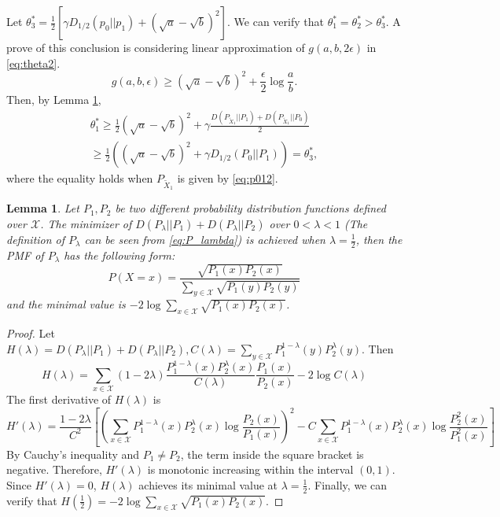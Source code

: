 \documentclass{article}
\newtheorem{lemma}{Lemma}
\begin{document}
Let $\theta^*_3 = \frac{1}{2}[\gamma D_{1/2}(p_0||p_1) + (\sqrt{a} - \sqrt{b})^2]$.
We can verify that $\theta_1^*=\theta_2^*>\theta^*_3$.
A prove of this conclusion is considering
linear approximation of $g(a,b,2\epsilon)$
in \eqref{eq:theta2}.
\begin{equation}\label{eq:g_linear}
		g(a,b,\epsilon) \geq  (\sqrt{a} - \sqrt{b})^2 + \frac{\epsilon}{2}\log \frac{a}{b}. 
	\end{equation}
	Then, by Lemma \ref{lem:p0p12},
	\begin{align*}
		\theta^*_1 \geq \frac{1}{2}(\sqrt{a}-\sqrt{b})^2+\gamma \frac{D(P_{\widetilde{X}_1} || P_1) + D(P_{\widetilde{X}_1} || P_0)}{2} \\
		\geq \frac{1}{2}((\sqrt{a}-\sqrt{b})^2+\gamma D_{1/2}(P_0||P_1))=\theta^*_3,
	\end{align*}
	where the equality holds when $P_{\widetilde{X}_1}$ is given by \eqref{eq:p012}. 
	\begin{lemma}\label{lem:p0p12}
		Let $P_1, P_2$ be two different
        probability distribution functions defined over $\mathcal{X}$.
        The minimizer
		of $D(P_{\lambda}||P_1) + 
        D(P_{\lambda}||P_2)$ 
        over $0<\lambda < 1$
        (The definition of $P_{\lambda}$
        can be seen from \eqref{eq:P_lambda})
        is achieved when $\lambda=\frac{1}{2}$,
        then the PMF of $P_{\lambda}$ has the following form:
		\begin{equation}\label{eq:p012}
			P(X=x)=\frac{\sqrt{P_1(x)
            P_2(x)}}
            { \sum_{y\in \mathcal{X}} 
            \sqrt{P_1(y)
                P_2(y)}
            }
		\end{equation}
		and the minimal value is
		$-2\log \sum_{x\in \mathcal{X}} 
        \sqrt{P_1(x) P_2(x)}$.
	\end{lemma}
\begin{proof}
    Let $H(\lambda)=D(P_{\lambda}||P_1) + 
    D(P_{\lambda}||P_2), C(\lambda)=\sum_{y \in \mathcal{X}}
    P_1^{1-\lambda}(y)
    P_2^{\lambda} (y)$.
    Then
    \begin{equation}
        H(\lambda)
        = \sum_{x\in \mathcal{X}}
        (1-2\lambda)\frac{P^{1-\lambda}_1(x)P^{\lambda}_2(x)}
        {C(\lambda)}\frac{P_1(x)}
        {P_2(x)} - 2 \log C(\lambda)
    \end{equation}
    The first derivative of $H(\lambda)$ is
    \begin{equation}
        H'(\lambda) = \frac{1-2\lambda}{C^2}
        \left[
            \left(\sum_{x\in \mathcal{X}}
            P_1^{1-\lambda}(x)
            P_2^{\lambda}(x) \log\frac{P_2(x)}{P_1(x)}
            \right)^2
            - C \sum_{x\in \mathcal{X}}P_1^{1-\lambda}(x)
            P_2^{\lambda}(x) \log\frac{P^2_2(x)}{P^2_1(x)}
        \right]
    \end{equation}
    By Cauchy's inequality and $P_1\neq P_2$,
    the term inside the
    square bracket is negative.
    Therefore, $H'(\lambda)$ is monotonic increasing within
    the interval $(0,1)$. Since $H'(\lambda)=0$,
    $H(\lambda)$ achieves its minimal value at $\lambda=\frac{1}{2}$.
    Finally, we can verify that 
    $H(\frac{1}{2})=-2\log \sum_{x\in \mathcal{X}} 
    \sqrt{P_1(x) P_2(x)}$.
\end{proof}
\end{document}
